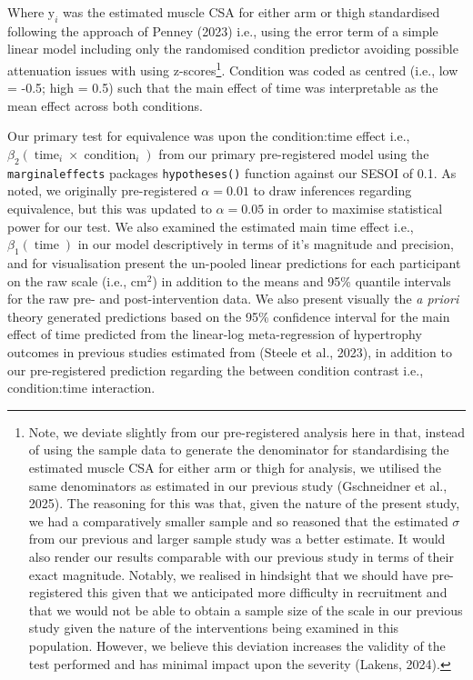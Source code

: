 \documentclass[
]{article}
\begin{document}
Where \(\textrm{y}_{i}\) was the estimated muscle CSA for either arm or
thigh standardised following the approach of Penney (2023) i.e., using
the error term of a simple linear model including only the randomised
condition predictor avoiding possible attenuation issues with using
z-scores\footnote{Note, we deviate slightly from our pre-registered
  analysis here in that, instead of using the sample data to generate
  the denominator for standardising the estimated muscle CSA for either
  arm or thigh for analysis, we utilised the same denominators as
  estimated in our previous study (Gschneidner et al., 2025). The
  reasoning for this was that, given the nature of the present study, we
  had a comparatively smaller sample and so reasoned that the estimated
  \(\sigma\) from our previous and larger sample study was a better
  estimate. It would also render our results comparable with our
  previous study in terms of their exact magnitude. Notably, we realised
  in hindsight that we should have pre-registered this given that we
  anticipated more difficulty in recruitment and that we would not be
  able to obtain a sample size of the scale in our previous study given
  the nature of the interventions being examined in this population.
  However, we believe this deviation increases the validity of the test
  performed and has minimal impact upon the severity (Lakens, 2024).}.
Condition was coded as centred (i.e., low = -0.5; high = 0.5) such that
the main effect of time was interpretable as the mean effect across both
conditions.

Our primary test for equivalence was upon the condition:time effect
i.e.,
\(\beta_{2}(\operatorname{time}_i \times \operatorname{condition}_i)\)
from our primary pre-registered model using the \texttt{marginaleffects}
packages \texttt{hypotheses()} function against our SESOI of 0.1. As
noted, we originally pre-registered \(\alpha=0.01\) to draw inferences
regarding equivalence, but this was updated to \(\alpha=0.05\) in order
to maximise statistical power for our test. We also examined the
estimated main time effect i.e., \(\beta_{1}(\operatorname{time})\) in
our model descriptively in terms of it's magnitude and precision, and
for visualisation present the un-pooled linear predictions for each
participant on the raw scale (i.e., cm\(^2\)) in addition to the means
and 95\% quantile intervals for the raw pre- and post-intervention data.
We also present visually the \emph{a priori} theory generated
predictions based on the 95\% confidence interval for the main effect of
time predicted from the linear-log meta-regression of hypertrophy
outcomes in previous studies estimated from (Steele et al., 2023), in
addition to our pre-registered prediction regarding the between
condition contrast i.e., condition:time interaction.
\end{document}
